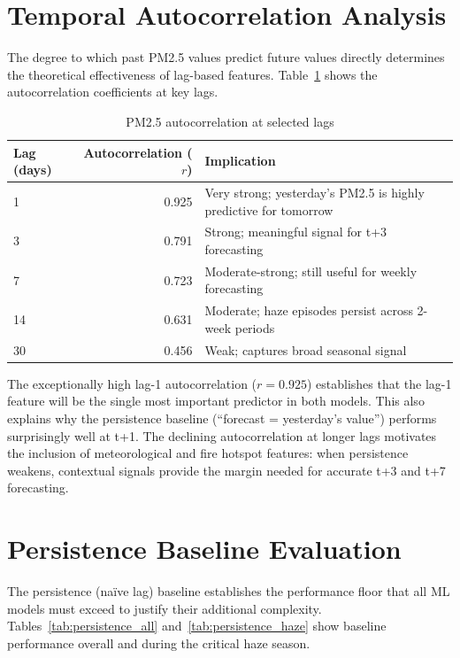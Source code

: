 \documentclass[12pt,a4paper]{report}
\begin{document}
\section{Temporal Autocorrelation Analysis}

The degree to which past PM2.5 values predict future values directly determines the theoretical effectiveness of lag-based features. Table~\ref{tab:autocorr} shows the autocorrelation coefficients at key lags.

\begin{table}[H]
\centering
\caption{PM2.5 autocorrelation at selected lags}
\label{tab:autocorr}
\begin{tabularx}{\textwidth}{@{}lrX@{}}
\toprule
\textbf{Lag (days)} & \textbf{Autocorrelation ($r$)} & \textbf{Implication} \\
\midrule
1  & 0.925 & Very strong; yesterday's PM2.5 is highly predictive for tomorrow \\
3  & 0.791 & Strong; meaningful signal for t+3 forecasting \\
7  & 0.723 & Moderate-strong; still useful for weekly forecasting \\
14 & 0.631 & Moderate; haze episodes persist across 2-week periods \\
30 & 0.456 & Weak; captures broad seasonal signal \\
\bottomrule
\end{tabularx}
\end{table}

The exceptionally high lag-1 autocorrelation ($r = 0.925$) establishes that the lag-1 feature will be the single most important predictor in both models. This also explains why the persistence baseline (``forecast = yesterday's value'') performs surprisingly well at t+1. The declining autocorrelation at longer lags motivates the inclusion of meteorological and fire hotspot features: when persistence weakens, contextual signals provide the margin needed for accurate t+3 and t+7 forecasting.

\section{Persistence Baseline Evaluation}

The persistence (na\"ive lag) baseline establishes the performance floor that all ML models must exceed to justify their additional complexity. Tables~\ref{tab:persistence_all} and~\ref{tab:persistence_haze} show baseline performance overall and during the critical haze season.
\end{document}
